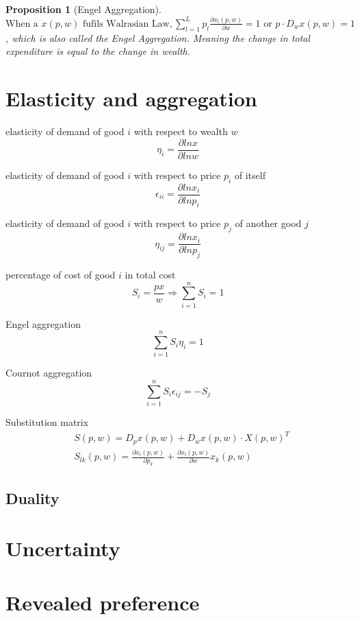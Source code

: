 \documentclass{article}
\newtheorem{proposition}{Proposition}
\begin{document}
\begin{proposition}[Engel Aggregation]
$\text{When a } x(p,w) \text{ fufils Walrasian Law}, \sum_{l=1}^{L} p_{l}\frac{\partial x_{l}(p,w)}{\partial w}=1 \text{ or } p\cdot D_{w}x(p,w)=1$, which is also called the Engel Aggregation. Meaning the change in total expenditure is equal to the change in wealth.
\end{proposition}

\section{Elasticity and aggregation}
elasticity of demand of good $i$ with respect to wealth $w$
$$\eta_{i}=\frac{\partial ln x}{\partial lnw}$$

elasticity of demand of good $i$ with respect to price $p_{i}$ of itself
$$\epsilon_{ii}=\frac{\partial ln x_{i}}{\partial lnp_{i}}$$

elasticity of demand of good $i$ with respect to price $p_{j}$ of another good $j$
$$\eta_{ij}=\frac{\partial ln x_{i}}{\partial lnp_{j}}$$

percentage of cost of good $i$ in total cost
$$S_{i}=\frac{px}{w} \Rightarrow \sum\limits_{i=1}^{n} S_{i}=1$$

Engel aggregation
$$\sum\limits_{i=1}^{n} S_{i} \eta_{i}=1$$

Cournot aggregation
$$\sum\limits_{i=1}^{n}S_{i}\epsilon_{ij}=-S_{j}$$


Substitution matrix
\begin{align}
&S(p,w)=D_{p}x(p,w)+D_{w}x(p,w) \cdot X(p,w)^{T}
\\&S_{lk}(p,w)=\frac{\partial x_{l}(p,w)}{\partial p_{k}}+\frac{\partial x_{l}(p,w)}{\partial w} x_{k}(p,w)
\end{align}




\subsection{Duality}






\section{Uncertainty}





\section{Revealed preference}
\end{document}
